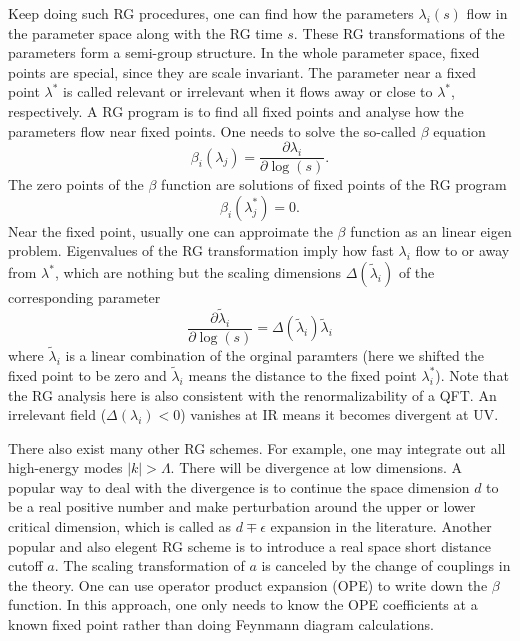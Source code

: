 \documentclass[submission, PhysLectNotes]{SciPost}
\begin{document}
Keep doing such RG procedures, one can find how the parameters $\lambda_i(s)$ flow in the parameter space along with the RG time $s$. These RG transformations of the parameters form a semi-group structure. In the whole parameter space, fixed points are special, since they are scale invariant. The parameter near a fixed point $\lambda^*$ is called relevant or irrelevant when it flows away or close to $\lambda^*$, respectively. A RG program is to find all fixed points and analyse how the parameters flow near fixed points. One needs to solve the so-called $\beta$ equation
\begin{equation}
\beta_i(\lambda_j) = \frac{\partial \lambda_i}{\partial \log(s)}.
\end{equation}
The zero points of the $\beta$ function are solutions of fixed points of the RG program
\begin{equation}
\beta_i(\lambda_j^*) = 0.
\end{equation}
Near the fixed point, usually one can approimate the $\beta$ function as an linear eigen problem. Eigenvalues of the RG transformation imply how fast $\lambda_i$ flow to or away from $\lambda^*$, which are nothing but the scaling dimensions $\Delta(\tilde{\lambda}_i)$ of the corresponding parameter
\begin{equation}
\frac{\partial \tilde{\lambda}_i}{\partial \log(s)} = \Delta \left(\tilde{\lambda}_i \right) \tilde{\lambda}_i
\end{equation}
where $\tilde{\lambda}_i$ is a linear combination of the orginal paramters (here we shifted the fixed point to be zero and $\tilde{\lambda}_i$ means the distance to the fixed point $\lambda^*_i$). Note that the RG analysis here is also consistent with the renormalizability of a QFT\@. An irrelevant field ($\Delta\left(\lambda_i\right)<0$) vanishes at IR means it becomes divergent at UV\@.

There also exist many other RG schemes. For example, one may integrate out all high-energy modes $\vert k \vert > \Lambda$. There will be divergence at low dimensions. A popular way to deal with the divergence is to continue the space dimension $d$ to be a real positive number and make perturbation around the upper or lower critical dimension, which is called as $d \mp \epsilon$ expansion in the literature. Another popular and also elegent RG scheme is to introduce a real space short distance cutoff $a$. The scaling transformation of $a$ is canceled by the change of couplings in the theory. One can use operator product expansion (OPE) to write down the $\beta$ function. In this approach, one only needs to know the OPE coefficients at a known fixed point rather than doing Feynmann diagram calculations.
\end{document}
